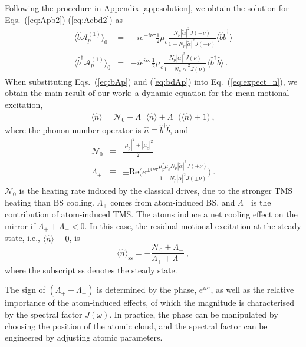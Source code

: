 \documentclass[aps, pra, reprint, amsmath, amssymb, groupedaddress, acknowledgments]{revtex4-1}
\begin{document}
Following the procedure in Appendix \ref{app:solution}, we obtain the solution for Eqs.~(\ref{eq:Apb2})-(\ref{eq:Acbd2}) as
\begin{eqnarray}\label{eq:bAp}
\langle \hat{b}\mathcal{A}_p^{(1)} \rangle_0 &=& -i e^{-i\nu\tau}\frac{1}{2}\mu_c \frac{N_p |\tilde{\alpha}|^2 J(-\nu)}{1- N_p |\tilde{\alpha}|^2 J(-\nu)} \langle \hat{b} \hat{b}^\dag\rangle \\
\langle \hat{b}^\dag \mathcal{A}_p^{(1)} \rangle_0 &=& -i e^{i\nu\tau} \frac{1}{2}\mu_c \frac{N_p |\tilde{\alpha}|^2 J(\nu)}{1- N_p |\tilde{\alpha}|^2 J(\nu)} \langle \hat{b}^\dag \hat{b}\rangle~. \label{eq:bdAp}
\end{eqnarray}
When substituting Eqs.~(\ref{eq:bAp}) and (\ref{eq:bdAp}) into Eq.~(\ref{eq:expect_n}), we obtain the main result of our work: a dynamic equation for the mean motional excitation,
\begin{equation}\label{eq:main}
\langle \dot{\hat{n}} \rangle = \mathcal{N}_0 +\Lambda_+ \langle \hat{n} \rangle +\Lambda_- \big(\langle \hat{n} \rangle+1 \big)~,
\end{equation}
where the phonon number operator is $\hat{n}\equiv \hat{b}^\dag \hat{b}$, and
\begin{eqnarray}
\mathcal{N}_0 &\equiv&  \frac{|\mu_p|^2+|\mu_c|^2}{2} \\
\Lambda_\pm &\equiv& \pm \textrm{Re}\Big(e^{\pm i\nu\tau} \frac{\mu_p^\ast \mu_c  N_p |\tilde{\alpha}|^2 J(\pm\nu)}{1- N_p |\tilde{\alpha}|^2 J(\pm \nu)} \Big)~.
\end{eqnarray}
$\mathcal{N}_0$ is the heating rate induced by the classical drives, due to the stronger TMS heating than BS cooling.  $\Lambda_+$ comes from atom-induced BS, and $\Lambda_-$ is the contribution of atom-induced TMS.  The atoms induce a net cooling effect on the mirror if $\Lambda_+ + \Lambda_- <0 $.  In this case, the residual motional excitation at the steady state, i.e., $\langle \dot{\hat{n}}\rangle =0$, is 
\begin{equation}
\langle \hat{n}\rangle_\textrm{ss} = -\frac{\mathcal{N}_0 + \Lambda_-}{\Lambda_+ + \Lambda_-}~,
\end{equation}
where the subscript ss denotes the steady state.

The sign of $(\Lambda_+ + \Lambda_- )$ is determined by the phase, $e^{i \nu \tau}$, as well as the relative importance of the atom-induced effects, of which the magnitude is characterised by the spectral factor $J(\omega)$.  
In practice, the phase can be manipulated by choosing the position of the atomic cloud, and the spectral factor can be engineered by adjusting atomic parameters.  
\end{document}
